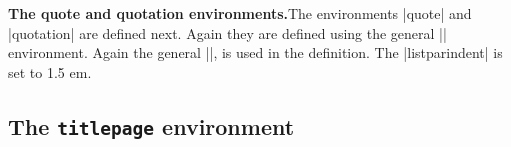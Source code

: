 \begin{multicols}{2}
\textbf{The quote and quotation environments.}\quad The environments |quote| and |quotation| are defined next. Again they are defined using the general |\list| environment. Again the general |\list|, is used in the definition. The |listparindent| is set to 1.5 em.
\end{multicols}

\begin{teX}
\newenvironment{quotation}
               {\list{}{\listparindent 1.5em%
                        \itemindent\listparindent
                        \rightmargin\leftmargin
                        \parsep\z@ \@plus\p@}%
                \item\relax}
               {\endlist}
\end{teX}

\begin{teX}
\newenvironment{quote}
               {\list{}{\rightmargin\leftmargin}%
                \item\relax}
               {\endlist}




\section{The \protect\texttt{titlepage} environment}
\if@compatibility
\newenvironment{titlepage}
    {%
      \cleardoublepage
      \if@twocolumn
        \@restonecoltrue\onecolumn
      \else
        \@restonecolfalse\newpage
      \fi
      \thispagestyle{empty}%
      \setcounter{page}\z@
    }%
    {\if@restonecol\twocolumn \else \newpage \fi
    }
\else
\newenvironment{titlepage}
    {%
      \cleardoublepage
      \if@twocolumn
        \@restonecoltrue\onecolumn
      \else
        \@restonecolfalse\newpage
      \fi
      \thispagestyle{empty}%
      \setcounter{page}\@ne
    }%
    {\if@restonecol\twocolumn \else \newpage \fi
     \if@twoside\else
        \setcounter{page}\@ne
     \fi
    }
\fi
\end{teX}



